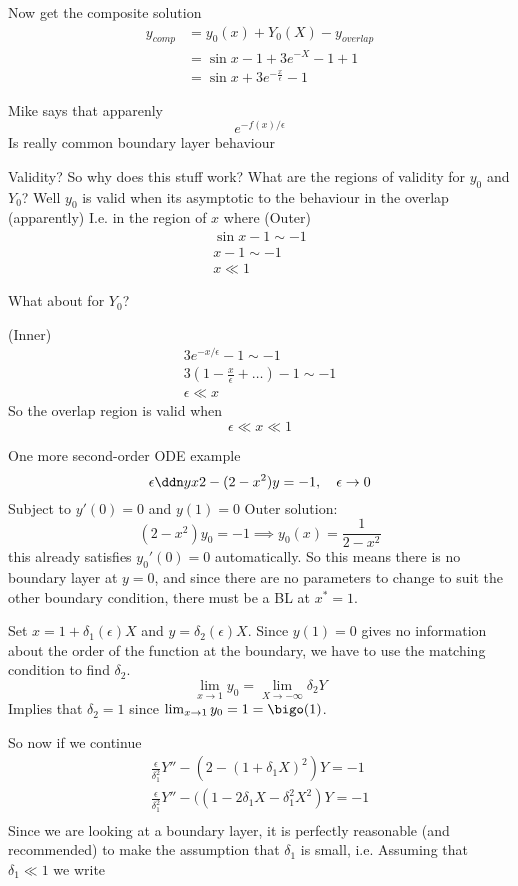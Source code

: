 \documentclass{/home/janmebows/Documents/LatexTemplates/myassignment}
\begin{document}
Now get the composite solution
\begin{align*}
    y_{comp} &= y_0(x) + Y_0(X) - y_{overlap}\\
    &= \sin x - 1 + 3e^{-X} -1 + 1\\
    &= \sin x + 3e^{-\frac x\epsilon}-1 
\end{align*}

Mike says that apparenly
\[e^{-f(x)/\epsilon}\]
Is really common boundary layer behaviour


Validity?
So why does this stuff work? What are the regions of validity for $y_0$ and $Y_0$?
Well $y_0$ is valid when its asymptotic to the behaviour in the overlap (apparently)
I.e. in the region of $x$ where
(Outer)
\begin{align*}
    \sin x -1 \sim -1\\
    x -1 \sim -1\\
    x \ll 1
\end{align*}

What about for $Y_0$?

(Inner)
\begin{align*}
    3e^{-x/\epsilon} -1 \sim -1\\
    3(1 - \frac{x}{\epsilon} + \ldots) -1 \sim -1\\
    \epsilon \ll x
\end{align*}
So the overlap region is valid when
\[\epsilon \ll x \ll 1 \]


One more second-order ODE example
\[\epsilon \ddn yx2 - (2-x^2) y = -1, \quad \epsilon \to 0\]
Subject to $y'(0) =0$ and $y(1) = 0$
Outer solution:
\[(2-x^2) y_0 = -1 \implies y_0(x) = \frac{1}{2-x^2}\]
this already satisfies $y_0'(0) =0$ automatically. So this means there is no boundary layer at $y=0$, and since there are no parameters to change to suit the other boundary condition, there must be a BL at $x^* =1$.

Set $x = 1+ \delta_1(\epsilon) X$ and $y = \delta_2(\epsilon) X$. Since $y(1) = 0$ gives no information about the order of the function at the boundary, we have to use the matching condition to find $\delta_2$.
\[\lim_{x\to 1} y_0 = \lim_{X\to -\infty} \delta_2 Y\]
Implies that $\delta_2 =1$ since $\lim_{x\to 1} y_0 = 1 = \bigo(1)$.

So now if we continue
\begin{align*}
    \frac{\epsilon}{\delta_1^2} Y'' - (2-(1+\delta_1 X)^2)Y=-1\\
    \frac{\epsilon}{\delta_1^2} Y'' - ((1- 2\delta_1 X - \delta_1^2 X^2)Y=-1\\
\end{align*}
Since we are looking at a boundary layer, it is perfectly reasonable (and recommended) to make the assumption that $\delta_1$ is small, i.e. Assuming that $\delta_1 \ll 1$ we write
\end{document}
